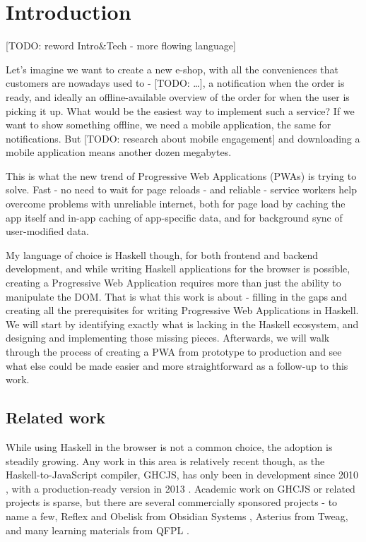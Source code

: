 \documentclass[english,odsaz]{fitthesis}
\date{\today}
\title{}
\begin{document}
\maketitle
\setlength{\parskip}{0pt}
{\hypersetup{hidelinks}\tableofcontents}
\iftotalfigures\listoffigures\fi
\iftotaltables\listoftables\fi
\iftwoside\cleardoublepage\fi
\setlength{\parskip}{0.5\bigskipamount}

\chapter{Introduction}
\label{sec:org270e8c8}
[TODO: reword Intro\&Tech - more flowing language]

Let's imagine we want to create a new e-shop, with all the conveniences that
customers are nowadays used to - [TODO: \ldots{}], a notification when the order is
ready, and ideally an offline-available overview of the order for when the user
is picking it up. What would be the easiest way to implement such a service? If
we want to show something offline, we need a mobile application, the same for
notifications. But [TODO: research about mobile engagement] and downloading a
mobile application means another dozen megabytes.

This is what the new trend of Progressive Web Applications (PWAs) is trying to
solve. Fast - no need to wait for page reloads - and reliable - service workers help
overcome problems with unreliable internet, both for page load by caching the
app itself and in-app caching of app-specific data, and for background sync of
user-modified data.

My language of choice is Haskell though, for both frontend and backend
development, and while writing Haskell applications for the browser is possible,
creating a Progressive Web Application requires more than just the ability to
manipulate the DOM. That is what this work is about - filling in the gaps and
creating all the prerequisites for writing Progressive Web Applications in
Haskell. We will start by identifying exactly what is lacking in the Haskell
ecosystem, and designing and implementing those missing pieces. Afterwards, we
will walk through the process of creating a PWA from prototype to production and
see what else could be made easier and more straightforward as a follow-up to
this work.

\section{Related work}
\label{sec:org2d34576}
While using Haskell in the browser is not a common choice, the adoption is
steadily growing. Any work in this area is relatively recent though, as the
Haskell-to-JavaScript compiler, GHCJS, has only been in development since 2010
\cite{ghcjs}, with a production-ready version in 2013 \cite{ghcjs-luite}. Academic
work on GHCJS or related projects is sparse, but there are several commercially
sponsored projects - to name a few, Reflex and Obelisk from Obsidian Systems
\cite{obsidian}, Asterius from Tweag, and many learning materials from QFPL
\cite{qfpl}.
\end{document}
